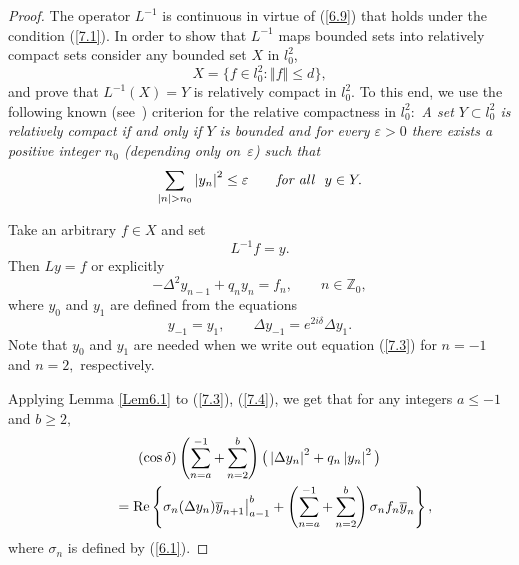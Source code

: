 \documentclass[pdftex]{sigma}
\numberwithin{equation}{section}
\begin{document}
\begin{proof}
The operator $L^{-1}$ is continuous in virtue of (\ref{6.9}) that holds
under the condition (\ref{7.1}). In order to show that $L^{-1}$ maps bounded
sets into relatively compact sets consider any bounded set $X$ in $l_{0}^{2}$,
\[
X=\big\{ f\in l_{0}^{2}:\left\Vert f\right\Vert \leq d\big\} ,
\]%
and prove that $L^{-1}(X)=Y$ is relatively compact in $l_{0}^{2}.$ To this
end, we use the following known (see~\cite{[17]}) criterion for the relative
compactness in $l_{0}^{2}:$ \textit{A set $Y\subset l_{0}^{2}$
is relatively compact if and only if  $Y$ is
bounded and for every $\varepsilon >0$ there exists a positive
integer $n_{0}$ (depending only on~$\varepsilon $) such
that}
\[
\sum_{\left\vert n\right\vert >n_{0}}\left\vert y_{n}\right\vert ^{2}\leq
\varepsilon \qquad \text{\textit{for all}} \ \ y\in Y.
\]

Take an arbitrary $f\in X$ and set
\[
L^{-1}f=y.
\]
Then $Ly=f$ or explicitly%
\begin{equation}
-\Delta ^{2}y_{n-1}+q_{n}y_{n}=f_{n},\qquad n\in
\mathbb{Z}
_{0},  \label{7.3}
\end{equation}%
where $y_{0}$ and $y_{1}$ are def\/ined from the equations%
\begin{equation}
y_{-1}=y_{1},\qquad \Delta y_{-1}=e^{2i\delta }\Delta y_{1}.
\label{7.4}
\end{equation}
Note that $y_{0}$ and $y_{1}$ are needed when we write out equation (\ref{7.3}) for $n=-1$ and $n=2,$ respectively.

Applying Lemma \ref{Lem6.1} to (\ref{7.3}), (\ref{7.4}), we get that for any
integers $a\leq -1$ and $b\geq 2,$%
\begin{gather}
(\cos \delta )\left( \sum_{n=a}^{-1}+\sum_{n=2}^{b}\right) \big(
\left\vert \Delta y_{n}\right\vert ^{2}+q_{n}\left\vert y_{n}\right\vert
^{2}\big)  \nonumber \\
\qquad {} ={\rm Re}\left\{ \sigma _{n}(\Delta y_{n})\overline{y}_{n+1}\big|_{a-1}^{b}+\left( \sum_{n=a}^{-1}+\sum_{n=2}^{b}\right) \sigma _{n}f_{n}%
\overline{y}_{n}\right\} ,  \label{7.5}
\end{gather}
where $\sigma _{n}$ is def\/ined by (\ref{6.1}).


\end{proof}
\end{document}
